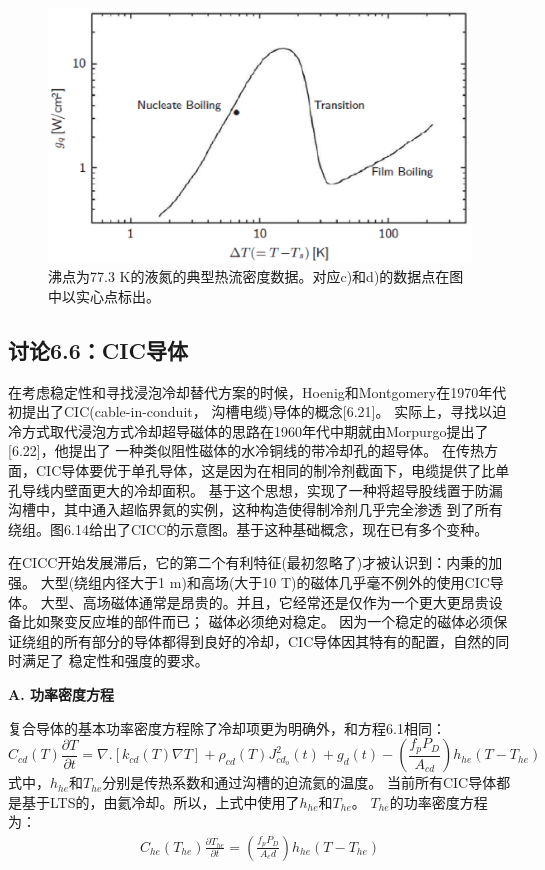 \begin{figure}[htbp]
	\centering
	\includegraphics[scale=0.6]{chpt6/figs/fig6.13.eps}
	\caption{沸点为77.3 K的液氮的典型热流密度数据。对应c)和d)的数据点在图中以实心点标出。}
\end{figure}

\subsection{讨论6.6：CIC导体}
在考虑稳定性和寻找浸泡冷却替代方案的时候，Hoenig和Montgomery在1970年代初提出了CIC(cable-in-conduit，
沟槽电缆)导体的概念[6.21]。
实际上，寻找以迫冷方式取代浸泡方式冷却超导磁体的思路在1960年代中期就由Morpurgo提出了[6.22]，他提出了
一种类似阻性磁体的水冷铜线的带冷却孔的超导体。
在传热方面，CIC导体要优于单孔导体，这是因为在相同的制冷剂截面下，电缆提供了比单孔导线内壁面更大的冷却面积。
基于这个思想，实现了一种将超导股线置于防漏沟槽中，其中通入超临界氦的实例，这种构造使得制冷剂几乎完全渗透
到了所有绕组。图6.14给出了CICC的示意图。基于这种基础概念，现在已有多个变种。

在CICC开始发展滞后，它的第二个有利特征(最初忽略了)才被认识到：内秉的加强。
大型(绕组内径大于1 m)和高场(大于10 T)的磁体几乎毫不例外的使用CIC导体。
大型、高场磁体通常是昂贵的。并且，它经常还是仅作为一个更大更昂贵设备比如聚变反应堆的部件而已；
磁体必须绝对稳定。
因为一个稳定的磁体必须保证绕组的所有部分的导体都得到良好的冷却，CIC导体因其特有的配置，自然的同时满足了
稳定性和强度的要求。

\textbf{A. 功率密度方程}

复合导体的基本功率密度方程除了冷却项更为明确外，和方程6.1相同：
\begin{equation}%
C_{cd}(T)\frac{\partial T}{\partial t}=\nabla.[k_{cd}(T)\nabla T]+\rho_{cd}(T)J_{cd_o}^2(t)+g_d(t)-(\frac{f_pP_D}{A_{cd}})h_{he}(T-T_{he})
\end{equation}
式中，$h_{he}$和$T_{he}$分别是传热系数和通过沟槽的迫流氦的温度。
当前所有CIC导体都是基于LTS的，由氦冷却。所以，上式中使用了$h_{he}$和$T_{he}$。
$T_{he}$的功率密度方程为：
\begin{align*}%
C_{he}(T_{he})\frac{\partial T_{he}}{\partial t}=(\frac{f_{p}P_D}{A_cd})h_{he}(T-T_{he})
\end{align*}


